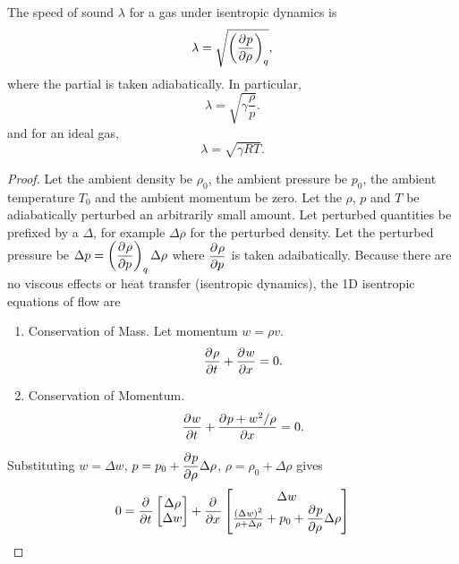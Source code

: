 \documentclass{doc}
\begin{document}
\begin{thm}
    The speed of sound $\lambda$ for a gas under isentropic dynamics is
    \begin{equation}
        \lambda = \sqrt{\left(\dfrac{\partial^{} {p}}{\partial {\rho}^{} }\right)_{q}},
    \end{equation}
    where the partial is taken adiabatically.  In particular,
    \begin{equation}
        \lambda = \sqrt{\gamma \frac{\rho}{p}}.
    \end{equation}
    and for an ideal gas,
    \begin{equation}
        \lambda = \sqrt{\gamma R T}.
    \end{equation}
\end{thm}
\begin{proof}
Let the ambient density be $\rho_0$, the ambient pressure be $p_0$,
the ambient temperature $T_0$ and the ambient momentum be zero.
Let the $\rho$, $p$ and $T$ be adiabatically perturbed an arbitrarily small amount.
Let perturbed quantities be prefixed by a $\Delta$, for example $\Delta \rho$ for
the perturbed density.
Let the perturbed pressure be $\Delta p = \left(\dfrac{\partial^{} {\rho}}{\partial {p}^{} }\right)_q \Delta\rho$
where $\dfrac{\partial^{} {\rho}}{\partial {p}^{} }$ is taken adaibatically.  Because there are no viscous effects or
heat transfer (isentropic dynamics), the 1D isentropic equations of flow are
\begin{enumerate}
    \item Conservation of Mass.  Let momentum $w=\rho v$.
        \begin{equation}
            \dfrac{\partial^{} {\rho}}{\partial {t}^{} } + \dfrac{\partial^{} {w}}{\partial {x}^{} } = 0.
        \end{equation}
    \item Conservation of Momentum.
        \begin{equation}
            \dfrac{\partial^{} {w}}{\partial {t}^{} } + \dfrac{\partial^{} { p + w^2/\rho }}{\partial {x}^{} } = 0.
        \end{equation}
\end{enumerate}
Substituting $w = \Delta w$, $p=p_0 + \dfrac{\partial^{} {p}}{\partial {\rho}^{} } \Delta \rho$, $\rho = \rho_0 + \Delta \rho$
gives 
\begin{equation}
0 = \dfrac{\partial^{} {}}{\partial {t}^{} } \begin{bmatrix}
    \Delta \rho \\
    \Delta w
\end{bmatrix} +
\dfrac{\partial^{} {}}{\partial {x}^{} } \begin{bmatrix}
    \Delta w \\
    \frac{(\Delta w)^2}{\rho + \Delta \rho} + p_0 + \dfrac{\partial^{} {p}}{\partial {\rho}^{} } \Delta \rho

\end{bmatrix}
\end{equation}
\end{proof}
\end{document}
